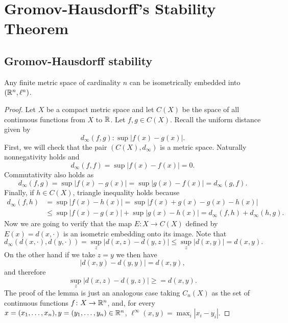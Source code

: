 \chapter{Gromov-Hausdorff's Stability Theorem}
\section{Gromov-Hausdorff stability}



\begin{lemma}
    Any finite metric space of cardinality $ n $ can be isometrically embedded into $(\mathbb R^n, \ell^n)$.
\end{lemma}
\begin{proof}
    Let $ X $ be a compact metric space and let $ C(X) $ be the space of all continuous functions from $ X $ to $ \mathbb R $. Let $ f, g \in C(X) $. Recall the uniform distance given by
    \begin{equation}
        d_\infty(f, g) \colon \sup | f(x) - g(x) |.
    \end{equation}
    First, we will check that the pair $ (C(X), d_\infty) $ is a metric space. Naturally nonnegativity holds and 
    \begin{equation}
        d_\infty(f, f) = \sup | f(x) - f(x) | = 0.
    \end{equation}
    Commutativity also holds as 
    \begin{equation}
        d_\infty(f, g) = \sup | f(x) - g(x) | = \sup | g(x) - f(x) | = d_\infty(g, f).
    \end{equation}
    Finally, if $ h \in C(X) $, triangle inequality holds because
    \begin{align}
        d_\infty(f, h) &= \sup | f(x) - h(x) | = \sup | f(x) + g(x) - g(x) - h(x) | \\
        &\leq \sup | f(x)- g(x) | + \sup | g(x) - h(x) | = d_\infty(f, h) + d_\infty(h, g).
    \end{align}
    Now we are going to verify that the map $ E \colon X \to C(X) $ defined by $ E(x) = d(x, \cdot) $ is an isometric embedding onto its image. Note that
    \begin{equation}
        d_\infty(d(x, \cdot), d(y, \cdot)) = \sup_z |d(x, z) - d(y, z)| \leq  \sup_z |d(x, y)| = d(x, y).
    \end{equation}
    On the other hand if we take $ z = y $ we then have
    \begin{equation}
        |d(x, y) - d(y, y)| = d(x, y),
    \end{equation}
    and therefore
    \begin{equation}
        \sup_z |d(x, z) - d(y, z)| \geq = d(x, y).
    \end{equation}
    The proof of the lemma is just an analogous case taking $ C_n(X) $ as the set of continuous functions $ f \colon X \to \mathbb R^n $, and, for every $ x = (x_1, \dots, x_n), y = (y_1, \dots, y_n) \in \mathbb R^n $, $ \ell^\infty(x, y) = \max_i |x_i - y_i|$.
\end{proof}


